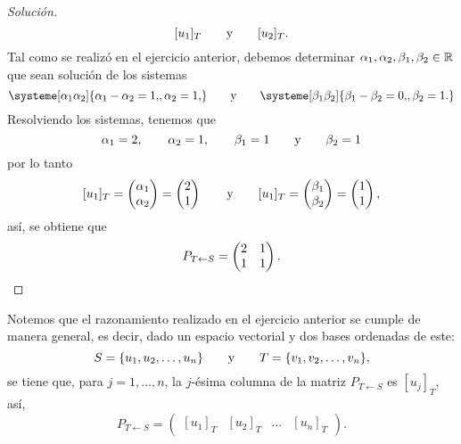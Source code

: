 \documentclass[a4,11pt]{aleph-notas}
\begin{document}
\begin{proof}[Solución]
    \[
        [u_1]_T
        \qquad\text{y}\qquad
        [u_2]_T.
    \]
    Tal como se realizó en el ejercicio anterior, debemos determinar $\alpha_1,\alpha_2,\beta_1,\beta_2\in\mathbb{R}$ que sean solución de los sistemas
    \[
        \systeme[\alpha_1\alpha_2]{
        \alpha_1 - \alpha_2 = 1{,},
        \alpha_2 = 1{,}
        }
        \texty
        \systeme[\beta_1\beta_2]{
        \beta_1 - \beta_2 = 0{,},
        \beta_2 = 1{.}
        }
    \]
    Resolviendo los sistemas, tenemos que
    \[
        \alpha_1 = 2,\qquad
        \alpha_2 = 1,\qquad
        \beta_1 = 1\qquad\text{y}\qquad
        \beta_2 = 1
    \]
    por lo tanto
    \[
        [u_1]_T 
        = \begin{pmatrix} \alpha_1\\ \alpha_2 \end{pmatrix}
        = \begin{pmatrix} 2\\ 1  \end{pmatrix}
        \qquad\text{y}\qquad
        [u_1]_T 
        = \begin{pmatrix} \beta_1\\ \beta_2 \end{pmatrix}
        = \begin{pmatrix} 1\\ 1  \end{pmatrix},
    \]
    así, se obtiene que
    \[
         P_{T \leftarrow S} = 
         \begin{pmatrix} 2 & 1\\ 1 & 1 \end{pmatrix}.\qedhere
    \]
\end{proof}


\begin{advertencia}
    Notemos que el razonamiento realizado en el ejercicio anterior se cumple de manera general, es decir, dado un espacio vectorial y dos bases ordenadas de este:
    \[
        S = \{u_1,u_2,\ldots,u_n\}
        \qquad\text{y}\qquad
        T = \{v_1,v_2,\ldots,v_n\},
    \]
    se tiene que, para $j=1,\ldots,n$, la $j$-ésima columna de la matriz $P_{T\leftarrow S}$ es $[u_j]_T$, así,
    \[
        P_{T\leftarrow S} = 
        \begin{pmatrix}
        [u_1]_T & [u_2]_T & \ldots & [u_n]_T
        \end{pmatrix}.
    \]
\end{advertencia}
\end{document}
